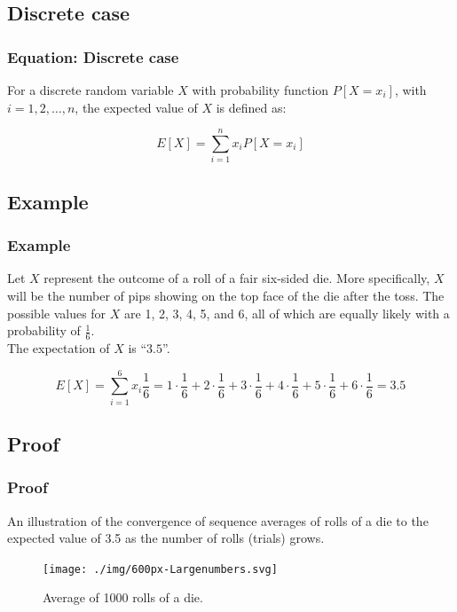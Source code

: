 \documentclass{beamer}
\begin{document}
    \subsection{Discrete case}\label{subsec:equation}
    \begin{frame}
        \frametitle{Equation: Discrete case}
        For a discrete random variable $X$ with probability function $P[X=x_i]$, with $i=1,2,\dots,n$, the expected value of $X$ is defined as:
        \begin{block}{}
            \begin{equation}
                E[X] = \sum_{i=1}^{n} x_i P[X=x_i]\label{eq:equation1}
            \end{equation}
        \end{block}
    \end{frame}

    \subsection{Example}\label{subsec:example}
    \begin{frame}
        \frametitle{Example}
        \begin{block}{}
            Let $X$ represent the outcome of a roll of a fair six-sided die.
            More specifically, $X$ will be the number of pips showing on the top face of the die after the toss.
            The possible values for $X$ are 1, 2, 3, 4, 5, and 6, all of which are equally likely with a probability of $\frac{1}{6}$.\\
            The expectation of $X$ is ``$3.5$''.
        \end{block}
        \begin{equation}
            E[X] = \sum_{i=1}^{6} x_i \frac{1}{6} = 1 \cdot \frac{1}{6} + 2 \cdot \frac{1}{6} + 3 \cdot \frac{1}{6} + 4 \cdot \frac{1}{6} + 5 \cdot \frac{1}{6} + 6 \cdot \frac{1}{6} = 3.5\label{eq:equation2}
        \end{equation}
    \end{frame}

    \subsection{Proof}\label{subsec:proof}
    \begin{frame}
        \frametitle{Proof}
        An illustration of the convergence of sequence averages of rolls of a die to the expected value of 3.5 as the number of rolls (trials) grows.
        \begin{figure}[h]
            \centering
            \texttt{[image: ./img/600px-Largenumbers.svg]}
            \caption{Average of 1000 rolls of a die.}
            \label{fig:example1}
        \end{figure}
    \end{frame}
\end{document}
